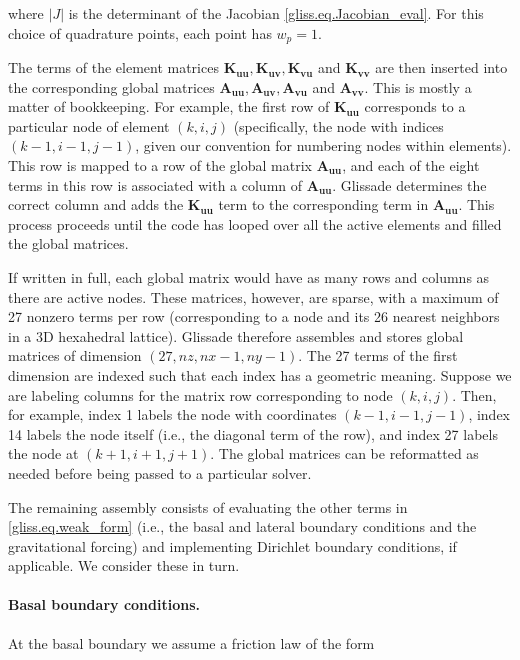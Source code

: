 \noindent
where $|J|$ is the determinant of the Jacobian \eqref{gliss.eq.Jacobian_eval}. For this choice of quadrature points,
each point has $w_p = 1$.

The terms of the element matrices $\mathbf{K_{uu}}, \mathbf{K_{uv}}, \mathbf{K_{vu}}$ and $\mathbf{K_{vv}}$
are then inserted into the corresponding global matrices $\mathbf{A_{uu}}, \mathbf{A_{uv}}, \mathbf{A_{vu}}$ and $\mathbf{A_{vv}}$.
This is mostly a matter of bookkeeping.
For example, the first row of $\mathbf{K_{uu}}$ corresponds to a particular node of element $(k,i,j)$
(specifically, the node with indices $(k-1,i-1,j-1)$, given our convention for numbering nodes within elements).  
This row is mapped to a row of the global matrix $\mathbf{A_{uu}}$, 
and each of the eight terms in this row is associated with a column of $\mathbf{A_{uu}}$.  
Glissade determines the correct column
and adds the $\mathbf{K_{uu}}$ term to the corresponding term in $\mathbf{A_{uu}}$.  This process proceeds
until the code has looped over all the active elements and filled the global matrices.

If written in full, each global matrix would have as many rows and columns as there are active nodes.
These matrices, however, are sparse, with a maximum of 27 nonzero terms per row (corresponding to
a node and its 26 nearest neighbors in a 3D hexahedral lattice).
Glissade therefore assembles and stores global matrices of dimension $(27,nz,nx-1,ny-1)$.
The 27 terms of the first dimension are indexed such that each index has a geometric meaning.
Suppose we are labeling columns for the matrix row corresponding to node $(k,i,j)$. 
Then, for example, index 1 labels the node with coordinates $(k-1,i-1,j-1)$, index 14 labels the
node itself (i.e., the diagonal term of the row), and index 27 labels the node at $(k+1,i+1,j+1)$.
The global matrices can be reformatted as needed before being passed to a particular solver. 

The remaining assembly consists of evaluating the other terms in \eqref{gliss.eq.weak_form}
(i.e., the basal and lateral boundary conditions and the gravitational forcing) and implementing
Dirichlet boundary conditions, if applicable. We consider these in turn.

\paragraph{Basal boundary conditions.}

At the basal boundary we assume a friction law of the form 


